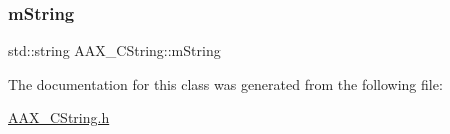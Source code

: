 \mbox{\label{a01573_a57df174f0327d832016b05ec17bcf87c}} 
\subsubsection{\texorpdfstring{mString}{mString}}
{\footnotesize\ttfamily std\+::string A\+A\+X\+\_\+\+C\+String\+::m\+String\hspace{0.3cm}{\ttfamily [protected]}}



The documentation for this class was generated from the following file\+:\begin{DoxyCompactItemize}
\item 
\mbox{\hyperlink{a00476}{A\+A\+X\+\_\+\+C\+String.\+h}}\end{DoxyCompactItemize}
